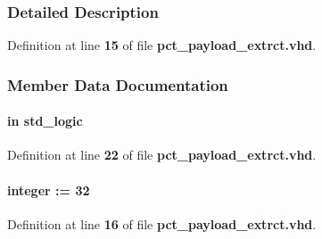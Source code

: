 \subsubsection{Detailed Description}


Definition at line {\bf 15} of file {\bf pct\+\_\+payload\+\_\+extrct.\+vhd}.



\subsubsection{Member Data Documentation}
\paragraph[{clk}]{ {\bfseries \textcolor{keywordflow}{in}\textcolor{vhdlchar}{ }} {\bfseries \textcolor{comment}{std\+\_\+logic}\textcolor{vhdlchar}{ }} \hspace{0.3cm}{\ttfamily [Port]}}\label{classpct__payload__extrct_a4a4609c199d30b3adebbeb3a01276ec5}


Definition at line {\bf 22} of file {\bf pct\+\_\+payload\+\_\+extrct.\+vhd}.

\paragraph[{data\+\_\+w}]{ {\bfseries \textcolor{vhdlchar}{ }} {\bfseries \textcolor{comment}{integer}\textcolor{vhdlchar}{ }\textcolor{vhdlchar}{ }\textcolor{vhdlchar}{\+:}\textcolor{vhdlchar}{=}\textcolor{vhdlchar}{ }\textcolor{vhdlchar}{ } \textcolor{vhdldigit}{32} \textcolor{vhdlchar}{ }} \hspace{0.3cm}{\ttfamily [Generic]}}\label{classpct__payload__extrct_ae15e994bb31f78e917b9a432aa0eff03}


Definition at line {\bf 16} of file {\bf pct\+\_\+payload\+\_\+extrct.\+vhd}.

